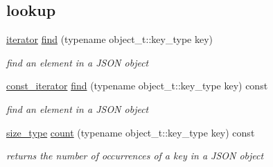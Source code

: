 \subsection*{lookup}
\begin{DoxyCompactItemize}
\item 
\mbox{\hyperlink{classnlohmann_1_1basic__json_a099316232c76c034030a38faa6e34dca}{iterator}} \mbox{\hyperlink{classnlohmann_1_1basic__json_aeed33787bd362c7ead59a4ba945392db}{find}} (typename object\+\_\+t\+::key\+\_\+type key)
\begin{DoxyCompactList}\small\item\em find an element in a J\+S\+ON object \end{DoxyCompactList}\item 
\mbox{\hyperlink{classnlohmann_1_1basic__json_a41a70cf9993951836d129bb1c2b3126a}{const\+\_\+iterator}} \mbox{\hyperlink{classnlohmann_1_1basic__json_a6d2f26a0a84787a43c989c88e2b7023b}{find}} (typename object\+\_\+t\+::key\+\_\+type key) const
\begin{DoxyCompactList}\small\item\em find an element in a J\+S\+ON object \end{DoxyCompactList}\item 
\mbox{\hyperlink{classnlohmann_1_1basic__json_a39f2cd0b58106097e0e67bf185cc519b}{size\+\_\+type}} \mbox{\hyperlink{classnlohmann_1_1basic__json_a5261eba9637f59d17d6cab5f14ce5747}{count}} (typename object\+\_\+t\+::key\+\_\+type key) const
\begin{DoxyCompactList}\small\item\em returns the number of occurrences of a key in a J\+S\+ON object \end{DoxyCompactList}\end{DoxyCompactItemize}
